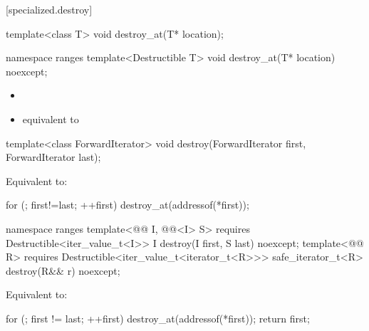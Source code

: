 [specialized.destroy]{}

%
\begin{itemdecl}
template<class T>
  void destroy_at(T* location);
\end{itemdecl}
\begin{addedblock}
\begin{itemdecl}
namespace ranges {
  template<Destructible T>
    void destroy_at(T* location) noexcept;
}
\end{itemdecl}
\end{addedblock}

\begin{itemdescr}
\pnum
\effects
\begin{itemize}
\item {}
\item {} equivalent to
\end{itemize}
\end{itemdescr}

%
\begin{itemdecl}
template<class ForwardIterator>
  void destroy(ForwardIterator first, ForwardIterator last);
\end{itemdecl}

\begin{itemdescr}
\pnum
\effects
Equivalent to:
\begin{codeblock}
for (; first!=last; ++first)
  destroy_at(addressof(*first));
\end{codeblock}
\end{itemdescr}

\begin{addedblock}
%
\begin{itemdecl}
namespace ranges {
  template<@@ I, @@<I> S>
      requires Destructible<iter_value_t<I>>
    I destroy(I first, S last) noexcept;
  template<@@ R>
      requires Destructible<iter_value_t<iterator_t<R>>>
    safe_iterator_t<R> destroy(R&& r) noexcept;
}
\end{itemdecl}

\begin{itemdescr}
\pnum
\effects Equivalent to:
\begin{codeblock}
for (; first != last; ++first)
  destroy_at(addressof(*first));
return first;
\end{codeblock}
\end{itemdescr}
\end{addedblock}


